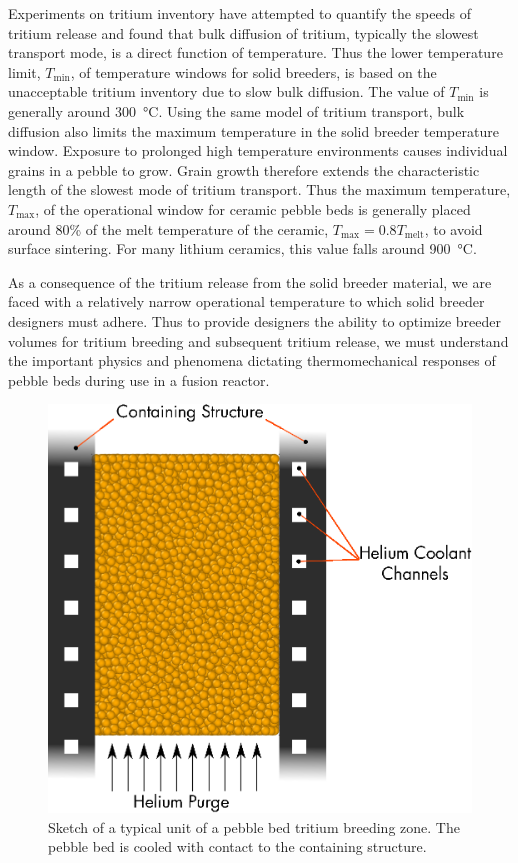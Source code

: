 Experiments on tritium inventory have attempted to quantify the speeds of tritium release and found that bulk diffusion of tritium, typically the slowest transport mode, is a direct function of temperature.\cite{Franza2013} Thus the lower temperature limit, $T_\text{min}$, of temperature windows for solid breeders, is based on the unacceptable tritium inventory due to slow bulk diffusion. The value of $T_\text{min}$ is generally around \SI{300}{\celsius}. Using the same model of tritium transport, bulk diffusion also limits the maximum temperature in the solid breeder temperature window. Exposure to prolonged high temperature environments causes individual grains in a pebble to grow. Grain growth therefore extends the characteristic length of the slowest mode of tritium transport. Thus the maximum temperature, $T_\text{max}$, of the operational window for ceramic pebble beds is generally placed around 80\% of the melt temperature of the ceramic, $T_\text{max} = 0.8 T_\text{melt}$, to avoid surface sintering. For many lithium ceramics, this value falls around \SI{900}{\celsius}.

As a consequence of the tritium release from the solid breeder material, we are faced with a relatively narrow operational temperature to which solid breeder designers must adhere. Thus to provide designers the ability to optimize breeder volumes for tritium breeding and subsequent tritium release, we must understand the important physics and phenomena dictating thermomechanical responses of pebble beds during use in a fusion reactor.


\begin{figure}[ht]
	\centering
	\includegraphics[width=\singleimagewidth]{figures/solid_breeder_sketch} 
	\caption{Sketch of a typical unit of a pebble bed tritium breeding zone. The pebble bed is cooled with contact to the containing structure.}
	\label{fig:solid-breeder-sketch}
\end{figure}

